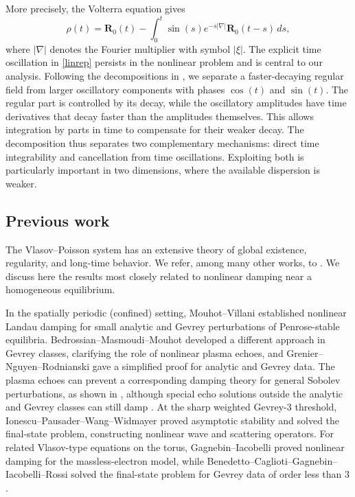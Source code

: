 \documentclass[reqno,11pt]{amsart}
\numberwithin{equation}{section}
\begin{document}
More precisely, the Volterra equation gives
\begin{equation}\label{linrep}
	\rho(t)=\mathbf R_0(t)
	-\int_0^t\sin(s)e^{-s|\nabla|}\mathbf R_0(t-s)\,ds,
\end{equation}
where $|\nabla|$ denotes the Fourier multiplier with symbol $|\xi|$.
The explicit time oscillation in \eqref{linrep} persists in the
nonlinear problem and is central to our analysis. Following the
decompositions in \cite{AIonescu2022,NWZ2024}, we separate a
faster-decaying regular field from larger oscillatory components
with phases $\cos(t)$ and $\sin(t)$. The regular part is controlled
by its decay, while the oscillatory amplitudes have time derivatives
that decay faster than the amplitudes themselves. This allows
integration by parts in time to compensate for their weaker decay.
The decomposition thus separates two complementary mechanisms:
direct time integrability and cancellation from time oscillations.
Exploiting both is particularly important in two dimensions, where
the available dispersion is weaker.

\subsection{Previous work}
The Vlasov--Poisson system has an extensive theory of global existence,
regularity, and long-time behavior. We refer, among many other works, to
\cite{arsenev,batt,EHorst1982,CBardos1985,FBouchut1991,CBardos2018,
	KPfaffelmoser1992,JSchaeffer1991,EHorst1993,RTGlassey1996,
	LionsPL1991,HJHwang2011,SHCHoi2011,JSmulevici2016,Xwang2018}.
We discuss here the results most closely related to nonlinear damping
near a homogeneous equilibrium.

In the spatially periodic (confined) setting, Mouhot--Villani
\cite{CMouhot2011} established nonlinear Landau damping for small
analytic and Gevrey perturbations of Penrose-stable equilibria. Bedrossian--Masmoudi--Mouhot \cite{JBedrossian2016} developed a different
approach in Gevrey classes, clarifying the role of nonlinear plasma
echoes, and Grenier--Nguyen--Rodnianski \cite{NguyenTT2020} gave a
simplified proof for analytic and Gevrey data. The plasma echoes can prevent a corresponding damping theory for general
Sobolev perturbations, as shown in \cite{Bedinsta}, although special echo solutions outside the
analytic and Gevrey classes can still damp \cite{GNRechoes}.
At the sharp weighted Gevrey-$3$ threshold, Ionescu--Pausader--Wang--Widmayer \cite{IPWWGevrey} proved
asymptotic stability and solved the final-state problem, constructing
nonlinear wave and scattering operators.
For related Vlasov-type equations on the torus, Gagnebin--Iacobelli
\cite{GagnebinIacobelli2023} proved nonlinear damping for the
massless-electron model, while
Benedetto--Caglioti--Gagnebin--Iacobelli--Rossi \cite{BCGIR2026}
solved the final-state problem for Gevrey data of order less than $3$.
\end{document}
